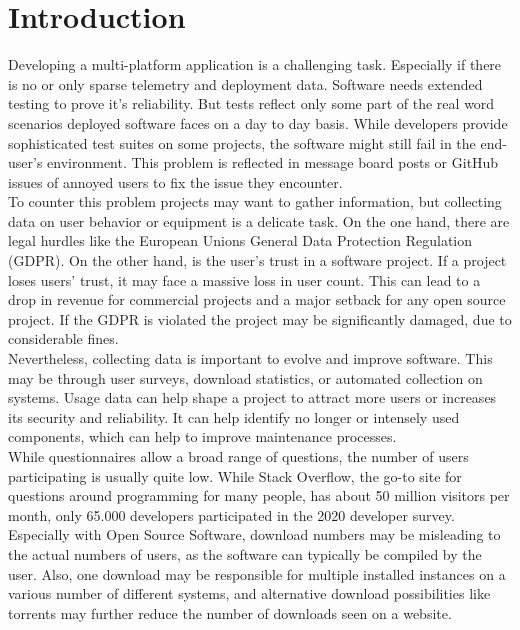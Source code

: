 \chapter{Introduction}
\label{chap:introduction}
%
Developing a multi-platform application is a challenging task. Especially if 
there is no or only sparse telemetry and deployment data. Software needs extended testing to prove it's reliability. But tests reflect only some part of the real word scenarios deployed software faces on a day to day basis. While developers provide sophisticated test suites on some projects, the software might still fail in the end-user's environment. This problem is reflected in message board posts or GitHub issues of annoyed users to fix the issue they encounter.\\

To counter this problem projects may want to gather information, but 
collecting data on user behavior or equipment is a delicate task. On the one hand, there are legal hurdles like the European Unions General Data Protection Regulation (GDPR). On the other hand, is the user's trust in a software project. If a project loses users' trust, it may face a massive loss in user count. This can lead to a drop in revenue for commercial projects and a major setback for any open source project. If the GDPR is violated the project may be significantly damaged, due to considerable fines.\\
Nevertheless, collecting data is important to evolve and improve software. This may be through user surveys, download statistics, or automated collection on systems.
Usage data can help shape a project to attract more users or increases its security and reliability.
It can help identify no longer or intensely used components, which can help to improve maintenance processes.\\
While questionnaires allow a broad range of questions, the number of users participating is usually quite low. While Stack Overflow, the go-to site for questions around programming for many people, has about 50 million visitors per month, only 65.000 developers participated in the 2020 developer survey\cite{noauthor_stack_nodate}.
Especially with Open Source Software, download numbers may be misleading to the actual numbers of users, as the software can typically be compiled by the user. Also, one download may be responsible for multiple installed instances on a various number of different systems, and alternative download possibilities like torrents may further reduce the number of downloads seen on a website.\\

